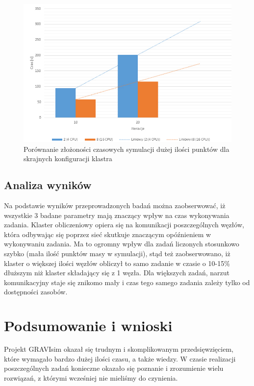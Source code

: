 \documentclass[a4paper,onecolumn,oneside,12pt]{memoir}
\begin{document}
{{\begin{figure}[h!]
	\centering
	\includegraphics[width=1\linewidth]{wykres-3}
	\caption{Porównanie złożoności czasowych symulacji dużej ilości punktów dla skrajnych konfiguracji klastra}
	\label{fig:stronaTytulowa}
\end{figure}

\vspace*{1mm}
\section{Analiza wyników}
Na podstawie wyników przeprowadzonych badań można zaobserwować, iż wszystkie 3 badane parametry mają znaczący wpływ na czas wykonywania zadania.
Klaster obliczeniowy opiera się na komunikacji poszczególnych węzłów, która odbywając się poprzez sieć skutkuje znaczącym opóźnieniem w wykonywaniu zadania. Ma to ogromny wpływ dla zadań liczonych stosunkowo szybko (mała ilość punktów masy w symulacji), stąd też zaobserwowano, iż klaster o większej ilości węzłów obliczył to samo zadanie w czasie o 10-15\% dłuższym niż klaster składający się z 1 węzła. Dla większych zadań, narzut komunikacyjny staje się znikomo mały i czas tego samego zadania zależy tylko od dostępności zasobów.


\chapter{Podsumowanie i wnioski}
\quad \quad Projekt GRAVIsim okazał się trudnym i skomplikowanym przedsięwzięciem, które wymagało bardzo dużej ilości czasu, a także wiedzy. W czasie realizacji poszczególnych zadań konieczne okazało się poznanie i zrozumienie wielu rozwiązań, z którymi wcześniej nie mieliśmy do czynienia.

}}
\end{document}
